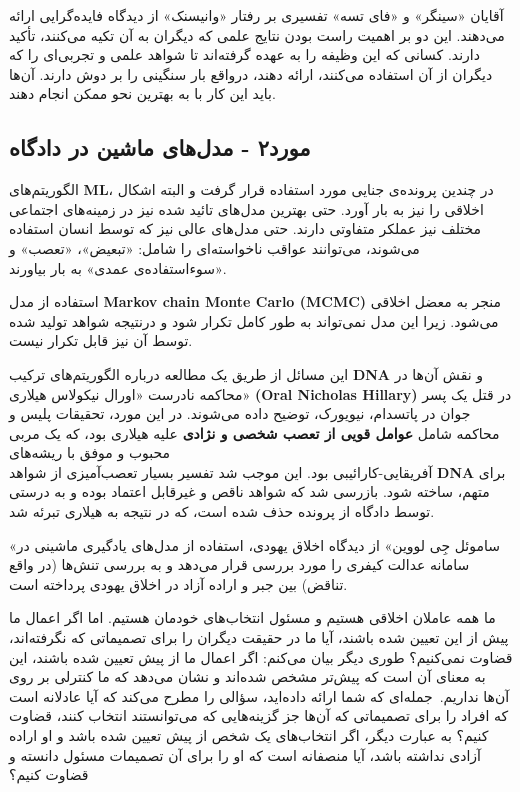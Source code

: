 آقایان «سینگر» و «فای تسه» تفسیری بر رفتار «وانیسنک» از دیدگاه فایده‌گرایی ارائه می‌دهند.
این دو بر اهمیت راست بودن نتایج علمی که دیگران به آن تکیه می‌کنند، تأکید دارند.
کسانی که این وظیفه را به عهده گرفته‌اند تا شواهد علمی و تجربی‌ای را که دیگران از آن استفاده می‌کنند، ارائه دهند، درواقع بار سنگینی را بر دوش دارند.
آن‌ها باید این کار با به بهترین نحو ممکن انجام دهند.
\newline
\newline

{
\subsection*{مورد۲ - مدل‌های ماشین در دادگاه}
\label{subsec:مورد۲ - مدل‌های ماشین در دادگاه}
الگوریتم‌های \textenglish{\textbf{ML}}، در چندین پرونده‌ی جنایی مورد استفاده قرار گرفت و البته اشکال اخلاقی را نیز به بار آورد.
حتی بهترین مدل‌های تائید شده نیز در زمینه‌های اجتماعی مختلف نیز عملکر متفاوتی دارند.
حتی مدل‌های عالی نیز که توسط انسان استفاده می‌شوند، می‌توانند عواقب ناخواسته‌ای را شامل: «تبعیض»، «تعصب» و «سوءاستفاده‌ی عمدی» به بار بیاورند.
}

استفاده از مدل \textenglish{\textbf{Markov chain Monte Carlo (MCMC)}} منجر به معضل اخلاقی می‌شود.
زیرا این مدل نمی‌تواند به طور کامل تکرار شود و درنتیجه شواهد تولید شده توسط آن نیز قابل تکرار نیست.

این مسائل از طریق یک مطالعه درباره الگوریتم‌های ترکیب \textenglish{\textbf{DNA}}  و نقش آن‌ها در محاکمه نادرست «اورال نیکولاس هیلاری» \textenglish{\textbf{(Oral Nicholas Hillary)}} در قتل یک پسر جوان در پاتسدام، نیویورک، توضیح داده می‌شوند.
در این مورد، تحقیقات پلیس و محاکمه شامل \textbf{عوامل قویی از تعصب شخصی و نژادی} علیه هیلاری بود، که یک مربی محبوب و موفق با ریشه‌های \\ آفریقایی-کارائیبی بود.
این موجب شد تفسیر بسیار تعصب‌آمیزی از شواهد \textenglish{\textbf{DNA}} برای متهم، ساخته شود.
بازرسی شد که شواهد ناقص و غیرقابل اعتماد بوده و به درستی توسط دادگاه از پرونده حذف شده است، که در نتیجه به هیلاری تبرئه شد.

«ساموئل جِی لووین» از دیدگاه اخلاق یهودی، استفاده از مدل‌های یادگیری ماشینی در سامانه عدالت کیفری را مورد بررسی قرار می‌دهد و به بررسی تنش‌ها (در واقع تناقض) بین جبر و اراده آزاد در اخلاق یهودی پرداخته است.

ما همه عاملان اخلاقی هستیم و مسئول انتخاب‌های خودمان هستیم.
اما اگر اعمال ما پیش از این تعیین شده باشند، آیا ما در حقیقت دیگران را برای تصمیماتی که نگرفته‌اند، قضاوت نمی‌کنیم؟ طوری دیگر بیان می‌کنم: اگر اعمال ما از پیش تعیین شده باشند، این به معنای آن است که پیش‌تر مشخص شده‌اند و نشان می‌دهد که ما کنترلی بر روی آن‌ها نداریم.\     جمله‌ای که شما ارائه داده‌اید، سؤالی را مطرح می‌کند که آیا عادلانه است که افراد را برای تصمیماتی که آن‌ها جز گزینه‌هایی که می‌توانستند انتخاب کنند، قضاوت کنیم؟ به عبارت دیگر، اگر انتخاب‌های یک شخص از پیش تعیین شده باشد و او اراده آزادی نداشته باشد، آیا منصفانه است که او را برای آن تصمیمات مسئول دانسته و قضاوت کنیم؟

